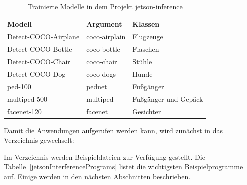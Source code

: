 \begin{table}
    \centering 
    \begin{tabular}{l|l|l}
      Modell               & Argument      & Klassen \\ \hline
      Detect-COCO-Airplane & coco-airplain & Flugzeuge\\
      Detect-COCO-Bottle   & coco-bottle   & Flaschen\\
      Detect-COCO-Chair    & coco-chair    & Stühle\\
      Detect-COCO-Dog      & coco-dogs     & Hunde\\
      ped-100              & pednet        & Fußgänger \\
      multiped-500         & multiped      & Fußgänger und Gepäck \\
      facenet-120          & facenet       & Gesichter
    \end{tabular}

   \caption{Trainierte Modelle in dem Projekt jetson-inference}\label{HelloWorld:Nets}







\end{table}


\bigskip



Damit die Anwendungen aufgerufen werden kann, wird zunächst in das Verzeichnis gewechselt:

\medskip


\medskip

Im Verzeichnis  werden Beispieldateien zur Verfügung gestellt. Die Tabelle~\ref{jetsonInterferencePrograms} listet die wichtigsten Beispielprogramme auf. Einige werden in den nächsten Abschnitten beschrieben.

